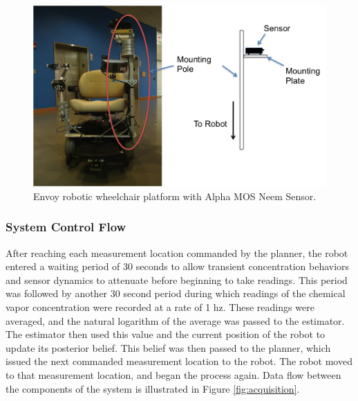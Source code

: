\documentclass[submit, 12pt]{aiaa-pretty-modified}
\begin{document}
\begin{figure}
\begin{center}
\includegraphics[width=5in]{img/wheelchair.pdf}
\caption{Envoy robotic wheelchair platform with Alpha MOS Neem Sensor.}
\label{fig:wheelchair}
\end{center}
\end{figure}

\FloatBarrier

\label{sec:mount}

\subsubsection{System Control Flow}

After reaching each measurement location commanded by the planner,
the robot entered a waiting period of 30 seconds to allow transient
concentration behaviors and sensor dynamics to attenuate before
beginning to take readings.  This period was followed by another 30
second period during which readings of the chemical vapor
concentration were recorded at a rate of 1 hz.  These readings were
averaged, and the natural logarithm of the average was passed to the
estimator.  The estimator then used this value and the current
position of the robot to update its posterior belief.  This belief was
then passed to the planner, which issued the next commanded
measurement location to the robot.  The robot moved to that measurement
location, and began the process again.  Data flow between the components of the system is illustrated in
Figure \ref{fig:acquisition}.
\end{document}
